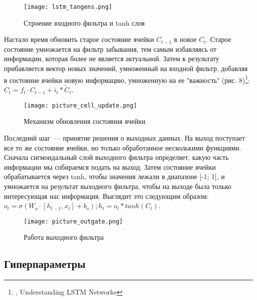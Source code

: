 \documentclass[12pt, a4paper]{article}
\begin{document}
\begin{figure}[h]
    \centering
    \texttt{[image: lstm\_tangens.png]}
		\caption{Строение входного фильтра и tanh слоя}
\end{figure}

Настало время обновить старое состояние ячейки $C_{t-1}$ в новое $C_t$. Старое состояние умножается на фильтр забывания, тем самым избавляясь от информации, которая более не является актуальной. Затем к результату прибавляется вектор новых значений, умноженный на входной фильтр, добавляя в состояние ячейки новую информацию, умноженную на ее "важность" (рис. 8)\footnote{\cite{Colah}, Understanding LSTM Networks}: $C_t = f_t \cdot C_{t-1} + i_t * \tilde C_t$.\\

\begin{figure}[h]
    \centering
    \texttt{[image: picture\_cell\_update.png]}
		\caption{Механизм обновления состояния ячейки}
\end{figure}

Последний шаг~--- принятие решения о выходных данных. На выход поступает все то же состояние ячейки, но только обработанное несколькими функциями. Сначала сигмоидальный слой выходного фильтра определяет, какую часть информации мы собираемся подать на выход. Затем состояние ячейки обрабатывается через tanh, чтобы значения лежали в диапазоне [-1; 1], и умножается на результат выходного фильтра, чтобы на выходе была только интересующая нас информация. Выглядит это следующим образом: $o_t = \sigma(W_o \cdot [h_{t-1}, x_t] + b_o); h_t = o_t * tanh(C_t)$. \\

\begin{figure}[h]
    \centering
    \texttt{[image: picture\_outgate.png]}
		\caption{Работа выходного фильтра}
\end{figure}

\subsection{Гиперпараметры}
\end{document}
